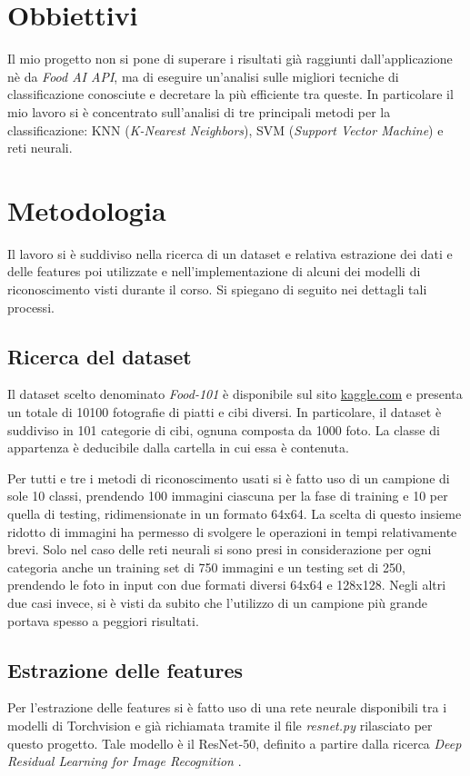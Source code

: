 \documentclass[11pt, a4paper, titlepage]{article}
\begin{document}
\section{Obbiettivi}
Il mio progetto non si pone di superare i risultati già raggiunti dall'applicazione nè da \textit{Food AI API}, ma di eseguire un'analisi sulle migliori tecniche di classificazione conosciute e decretare la più efficiente tra queste. In particolare il mio lavoro si è concentrato sull'analisi di tre principali metodi per la classificazione: KNN (\textit{K-Nearest Neighbors}), SVM (\textit{Support Vector Machine}) e reti neurali. 

\pagebreak

\section{Metodologia}
Il lavoro si è suddiviso nella ricerca di un dataset e relativa estrazione dei dati e delle features poi utilizzate e nell'implementazione di alcuni dei modelli di riconoscimento visti durante il corso. Si spiegano di seguito nei dettagli tali processi. 

\subsection{Ricerca del dataset}
Il dataset scelto denominato \emph{Food-101} \cite{food-101} è disponibile sul sito \url{kaggle.com} e presenta un totale di 10100 fotografie di piatti e cibi diversi. In particolare, il dataset è suddiviso in 101 categorie di cibi, ognuna composta da 1000 foto. La classe di appartenza è deducibile dalla cartella in cui essa è contenuta. 

Per tutti e tre i metodi di riconoscimento usati si è fatto uso di un campione di sole 10 classi, prendendo 100 immagini ciascuna per la fase di training e 10 per quella di testing, ridimensionate in un formato 64x64. La scelta di questo insieme ridotto di immagini ha permesso di svolgere le operazioni in tempi relativamente brevi. Solo nel caso delle reti neurali si sono presi in considerazione per ogni categoria anche un training set di 750 immagini e un testing set di 250, prendendo le foto in input con due formati diversi 64x64 e 128x128. Negli altri due casi invece, si è visti da subito che l'utilizzo di un campione più grande portava spesso a peggiori risultati. 

\subsection{Estrazione delle features}
Per l'estrazione delle features si è fatto uso di una rete neurale disponibili tra i modelli di Torchvision e già richiamata tramite il file \emph{resnet.py} rilasciato per questo progetto. Tale modello è il ResNet-50, definito a partire dalla ricerca \emph{Deep Residual Learning for Image Recognition} \cite{resnet50}.
\end{document}
